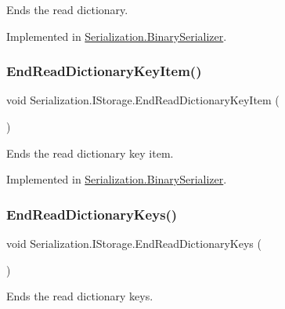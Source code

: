 Ends the read dictionary. 



Implemented in \hyperlink{class_serialization_1_1_binary_serializer_aeacb7cb7b4c86a1ad310ac1b0674c18c}{Serialization.\+Binary\+Serializer}.

\mbox{\label{interface_serialization_1_1_i_storage_afdfcddaf43f8c474af85a0667541f785}} 
\subsubsection{\texorpdfstring{End\+Read\+Dictionary\+Key\+Item()}{EndReadDictionaryKeyItem()}}
{\footnotesize\ttfamily void Serialization.\+I\+Storage.\+End\+Read\+Dictionary\+Key\+Item (\begin{DoxyParamCaption}{ }\end{DoxyParamCaption})}



Ends the read dictionary key item. 



Implemented in \hyperlink{class_serialization_1_1_binary_serializer_a40a35f67bceb9c7c1cac774afe4b5fd0}{Serialization.\+Binary\+Serializer}.

\mbox{\label{interface_serialization_1_1_i_storage_a4d7be7471ebc9555ec62f3d1e91b53a8}} 
\subsubsection{\texorpdfstring{End\+Read\+Dictionary\+Keys()}{EndReadDictionaryKeys()}}
{\footnotesize\ttfamily void Serialization.\+I\+Storage.\+End\+Read\+Dictionary\+Keys (\begin{DoxyParamCaption}{ }\end{DoxyParamCaption})}



Ends the read dictionary keys. 



